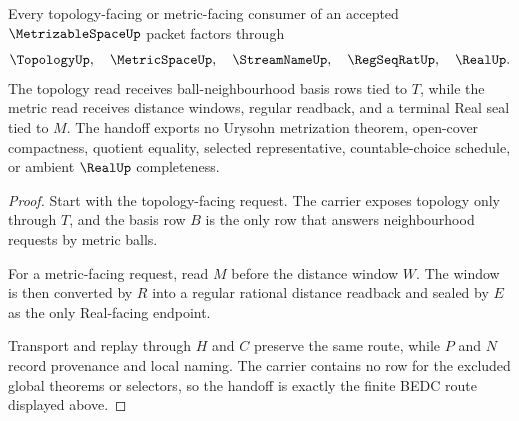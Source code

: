 \begin{theorem}
\label{thm:metrizable-space-metric-topology-handoff}
Every topology-facing or metric-facing consumer of an accepted $\MetrizableSpaceUp$ packet factors through
$$
\TopologyUp,\quad \MetricSpaceUp,\quad \StreamNameUp,\quad \RegSeqRatUp,\quad \RealUp .
$$
The topology read receives ball-neighbourhood basis rows tied to $T$, while the metric read receives distance windows, regular readback, and a terminal Real seal tied to $M$. The handoff exports no Urysohn metrization theorem, open-cover compactness, quotient equality, selected representative, countable-choice schedule, or ambient $\RealUp$ completeness.
\end{theorem}
\begin{proof}
Start with the topology-facing request. The carrier exposes topology only through $T$, and the basis row $B$ is the only row that answers neighbourhood requests by metric balls.

For a metric-facing request, read $M$ before the distance window $W$. The window is then converted by $R$ into a regular rational distance readback and sealed by $E$ as the only Real-facing endpoint.

Transport and replay through $H$ and $C$ preserve the same route, while $P$ and $N$ record provenance and local naming. The carrier contains no row for the excluded global theorems or selectors, so the handoff is exactly the finite BEDC route displayed above.
\end{proof}


\begin{closurestatus}{\MetrizableSpaceUp}
  \theoryclosure{\seedClosure}
  \formalstatus{\unformalizedV}
\end{closurestatus}

